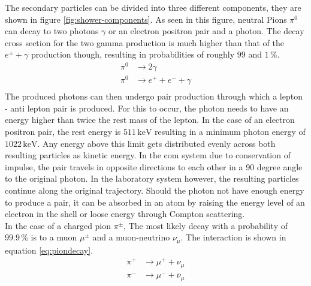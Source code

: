 \documentclass[abstract,toc,los,lof,english,10pt,glossary,acronyms]{jluthesis}
\begin{document}
The secondary particles can be divided into three different components, they are shown in figure \ref{fig:shower-components}.
As seen in this figure, neutral Pions $\pi^0$ can decay to two photons $\gamma$ or an electron positron pair and a photon. The decay cross section for the two gamma production is much higher than that of the $e^\pm + \gamma$ production though, resulting in probabilities of roughly $99$ and $1\,\%$. 
\begin{equation}
	\begin{aligned}
		\pi^0 &\rightarrow 2\gamma \\
		\pi^0 &\rightarrow e^+ + e^- + \gamma \\
	\end{aligned}
\end{equation}
The produced photons can then undergo pair production through which a lepton - anti lepton pair is produced. For this to occur, the photon needs to have an energy higher than twice the rest mass of the lepton. In the case of an electron positron pair, the rest energy is $511\,\text{keV}$ resulting in a minimum photon energy of $1022\,\text{keV}$. Any energy above this limit gets distributed evenly across both resulting particles as kinetic energy. In the \acrfull{com} system due to conservation of impulse, the pair travels in opposite directions to each other in a 90 degree angle to the original photon. In the laboratory system however, the resulting particles continue along the original trajectory.
Should the photon not have enough energy to produce a pair, it can be absorbed in an atom by raising the energy level of an electron in the shell or loose energy through Compton scattering.\\
In the case of a charged pion $\pi^\pm$, The most likely decay with a probability of $99.9\,\%$ is to a muon $\mu^\pm$ and a muon-neutrino $\nu_\mu$. The interaction is shown in equation \ref{eq:piondecay}.
\begin{equation}\label{eq:piondecay}
	\begin{aligned}
		\pi^+ &\rightarrow \mu^+ + \nu_\mu \\
		\pi^- &\rightarrow \mu^- + \bar{\nu}_\mu
	\end{aligned}
\end{equation}
\end{document}
